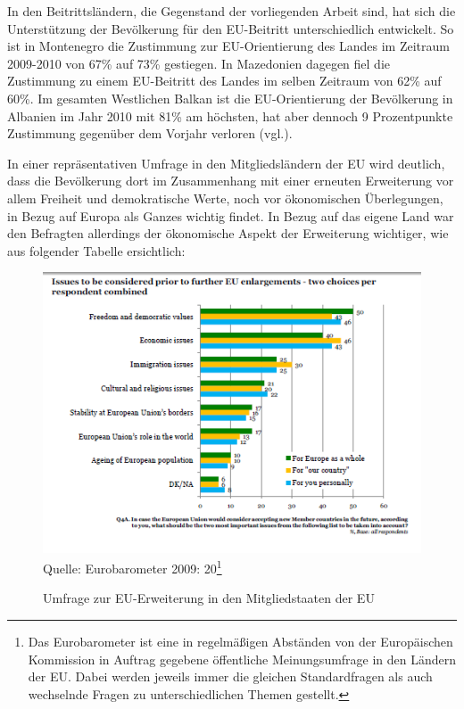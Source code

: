 In den Beitrittsländern, die Gegenstand der vorliegenden Arbeit sind, hat sich die Unterstützung der Bevölkerung für den EU-Beitritt unterschiedlich entwickelt. So ist in Montenegro die Zustimmung zur EU-Orientierung des Landes im Zeitraum 2009-2010 von 67\% auf 73\% gestiegen. In Mazedonien dagegen fiel die Zustimmung zu einem EU-Beitritt des Landes im selben Zeitraum von 62\% auf 60\%. Im gesamten Westlichen Balkan ist die EU-Orientierung der Bevölkerung in Albanien im Jahr 2010 mit 81\% am höchsten, hat aber dennoch 9 Prozentpunkte Zustimmung gegenüber dem Vorjahr verloren (vgl.\cite{gallup10}).\par
In einer repräsentativen Umfrage in den Mitgliedsländern der EU wird deutlich, dass die Bevölkerung dort im Zusammenhang mit einer erneuten Erweiterung vor allem Freiheit und demokratische Werte, noch vor ökonomischen Überlegungen, in Bezug auf Europa als Ganzes wichtig findet. In Bezug auf das eigene Land war den Befragten allerdings der ökonomische Aspekt der Erweiterung wichtiger, wie aus folgender Tabelle ersichtlich:
\begin{figure}[H]
  \caption{Umfrage zur EU-Erweiterung in den Mitgliedstaaten der EU }
  \centering
  \includegraphics[width=5in]{Material/Umfrage}\\
\scriptsize{Quelle: Eurobarometer 2009: 20}\footnote{Das Eurobarometer ist eine in regelmäßigen Abständen von der Europäischen Kommission in Auftrag gegebene öffentliche Meinungsumfrage in den Ländern der EU. Dabei werden jeweils immer die gleichen Standardfragen als auch wechselnde Fragen zu unterschiedlichen Themen gestellt.}
\end{figure}

